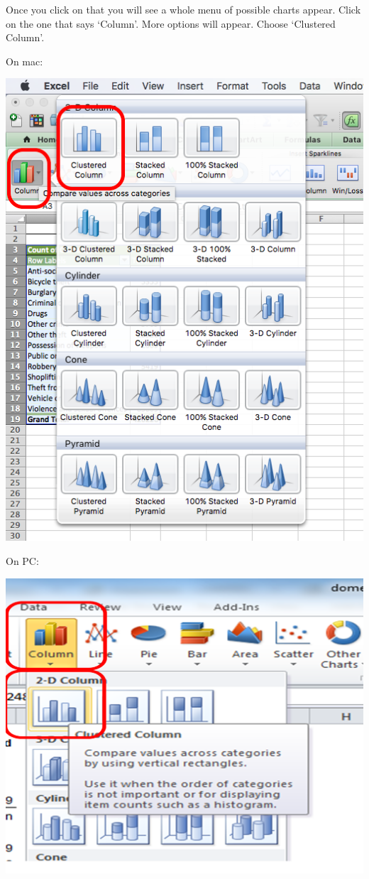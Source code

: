 \documentclass[
]{book}
\begin{document}
Once you click on that you will see a whole menu of possible charts appear. Click on the one that says `Column'. More options will appear. Choose `Clustered Column'.

On mac:

\includegraphics{imgs/click_column.png}

On PC:

\includegraphics{imgs/pc_cluster_bar.png}
\end{document}
